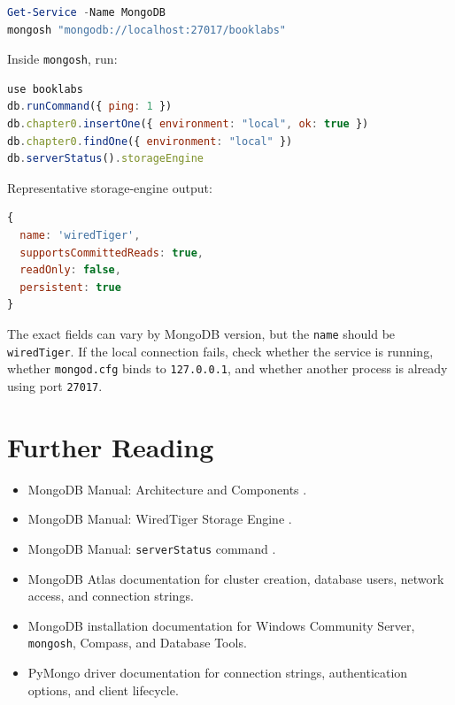 \begin{lstlisting}[language=PowerShell, caption={Local service and shell verification.}]
Get-Service -Name MongoDB
mongosh "mongodb://localhost:27017/booklabs"
\end{lstlisting}

Inside \texttt{mongosh}, run:

\begin{lstlisting}[language=JavaScript, caption={Expected local verification sequence.}]
use booklabs
db.runCommand({ ping: 1 })
db.chapter0.insertOne({ environment: "local", ok: true })
db.chapter0.findOne({ environment: "local" })
db.serverStatus().storageEngine
\end{lstlisting}

Representative storage-engine output:

\begin{lstlisting}[language=JavaScript, caption={Representative WiredTiger storage-engine output.}]
{
  name: 'wiredTiger',
  supportsCommittedReads: true,
  readOnly: false,
  persistent: true
}
\end{lstlisting}

The exact fields can vary by MongoDB version, but the \texttt{name} should be \texttt{wiredTiger}. If the local connection fails, check whether the service is running, whether \texttt{mongod.cfg} binds to \texttt{127.0.0.1}, and whether another process is already using port \texttt{27017}.

\section{Further Reading}
\begin{itemize}
    \item MongoDB Manual: Architecture and Components \cite{mongodbArchitectureDocs}.
    \item MongoDB Manual: WiredTiger Storage Engine \cite{mongodbWiredTigerDocs}.
    \item MongoDB Manual: \texttt{serverStatus} command \cite{mongodbServerStatusDocs}.
    \item MongoDB Atlas documentation for cluster creation, database users, network access, and connection strings.
    \item MongoDB installation documentation for Windows Community Server, \texttt{mongosh}, Compass, and Database Tools.
    \item PyMongo driver documentation for connection strings, authentication options, and client lifecycle.
\end{itemize}


